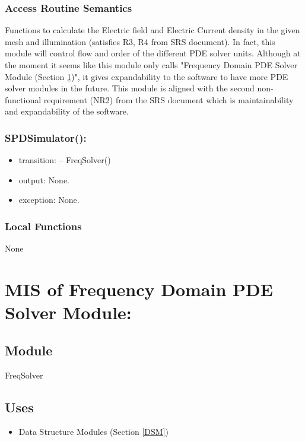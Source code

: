 \documentclass[12pt, titlepage]{article}
\begin{document}
\subsubsection{Access Routine Semantics}
Functions to calculate the Electric field and Electric Current
density in the given mesh and illumination (satisfies R3, R4 from SRS document). In fact, this module will control flow and order of the different PDE solver units. Although at the moment it seems like this module  only calls "Frequency Domain PDE Solver Module (Section \ref{FDSM})", it gives expandability to the software to have more PDE solver modules in the future. This module is aligned with the second non-functional requirement (NR2) from the SRS document which is maintainability and expandability of the software.

\subsubsection*{SPDSimulator():}
\begin{itemize}
	\item transition:
	\subitem -- FreqSolver() 
	\item output: None. 
	\item exception: None.
\end{itemize}

\subsubsection{Local Functions}
None



\newpage
%
%
%
%
\section{MIS of Frequency Domain PDE Solver Module:} \label{FDSM} 


\subsection{Module}
FreqSolver


\subsection{Uses}
\begin{itemize}
	\item Data Structure Modules (Section \ref{DSM})
\end{itemize}
\end{document}
